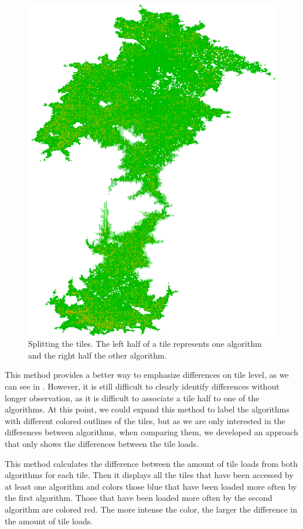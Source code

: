 \documentclass
[
    paper = a4,
    pagesize,
    12 pt,
    oneside,                       %
    open = right,
    DIV = calc,
    BCOR = 0 mm,                   %
    bibtotoc
]
{scrbook}
\begin{document}
\begin{figure}
    \includegraphics[width=\textwidth]{Images/vis-compare-splitted.png}
\caption[]{Splitting the tiles. The left half of a tile represents one algorithm and the right half the other algorithm.}
\label{fig:splitted_tiles}
\end{figure}

This method provides a better way to emphasize differences on tile level, as we can see in .
However, it is still difficult to clearly identify differences without longer observation, as it is difficult to associate a tile half to one of the algorithms.
At this point, we could expand this method to label the algorithms with different colored outlines of the tiles, but as we are only interested in the differences between algorithms, when comparing them, we developed an approach that only shows the differences between the tile loads.

This method calculates the difference between the amount of tile loads from both algorithms for each tile.
Then it displays all the tiles that have been accessed by at least one algorithm and colors those blue that have been loaded more often by the first algorithm.
Those that have been loaded more often by the second algorithm are colored red.
The more intense the color, the larger the difference in the amount of tile loads.
\end{document}
